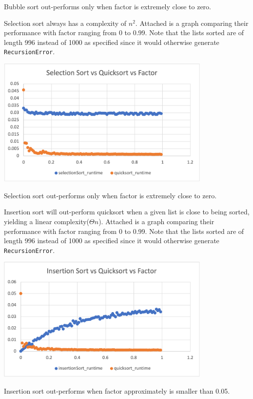 \documentclass{article}
\begin{document}
Bubble sort out-performs only when factor is extremely close to zero.

\medskip
Selection sort always has a complexity of $n^2$. Attached is a graph comparing their 
performance with factor ranging from 0 to 0.99. Note that the lists sorted are of 
length 996 instead of 1000 as specified since it would otherwise generate \verb|RecursionError|.

\includegraphics[width=0.8\textwidth]{selectionSort_vs_quicksort_vs_factor}

Selection sort out-performs only when factor is extremely close to zero.

\medskip
Insertion sort will out-perform quicksort when a given list is close to being sorted, 
yielding a linear complexity($\Theta{n}$). Attached is a graph comparing their 
performance with factor ranging from 0 to 0.99. Note that the lists sorted are of 
length 996 instead of 1000 as specified since it would otherwise generate \verb|RecursionError|.

\includegraphics[width=0.8\textwidth]{insertionSort_vs_quicksort_vs_factor}

Insertion sort out-performs when factor approximately is smaller than 0.05.
\end{document}

